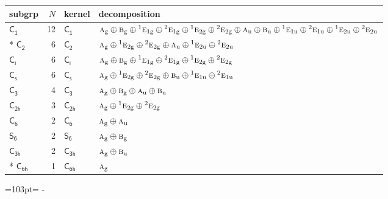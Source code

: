 \documentclass[10pt,a4paper]{article}
\newcommand{\needspace}[1]{\par\penalty-100\begingroup\dimen0=#1\relax\dimen2=\pagegoal
  \advance\dimen2-\pagetotal\ifdim\dimen0>\dimen2\relax\ifdim\dimen2>0pt\vfil\break\fi\fi
  \endgroup}
\numberwithin{equation}{section}
\newcommand{\grp}[1]{\mathsf{#1}}
\newcommand{\irr}[1]{\text{\normalfont\scshape #1}}
\newcommand{\conjpair}[1]{{}^{#1}}
\newcommand{\ptag}[1]{\mathrm{#1}}
\newlength{\fillwidth}\newlength{\cellwidth}\newlength{\colwidth}
\begin{document}
{\begin{longtable}{@{}lrl>{\RaggedRight\arraybackslash}p{\fillwidth}@{}}
subgrp & $N$ & kernel & decomposition\\\midrule\endhead
\bottomrule\endfoot\endlastfoot
\href{C1.pdf}{$\grp{C_{1}}$} & 12 & \href{C1.pdf}{$\grp{C_{1}}$} & $\irr{a}_{\ptag{g}}\oplus \irr{b}_{\ptag{g}}\oplus \conjpair{1}\irr{e}_{1\ptag{g}}\oplus \conjpair{2}\irr{e}_{1\ptag{g}}\oplus \conjpair{1}\irr{e}_{2\ptag{g}}\oplus \conjpair{2}\irr{e}_{2\ptag{g}}\oplus \irr{a}_{\ptag{u}}\oplus \irr{b}_{\ptag{u}}\oplus \conjpair{1}\irr{e}_{1\ptag{u}}\oplus \conjpair{2}\irr{e}_{1\ptag{u}}\oplus \conjpair{1}\irr{e}_{2\ptag{u}}\oplus \conjpair{2}\irr{e}_{2\ptag{u}}$\\*
\href{C2.pdf}{$\grp{C_{2}}$} & 6 & \href{C2.pdf}{$\grp{C_{2}}$} & $\irr{a}_{\ptag{g}}\oplus \conjpair{1}\irr{e}_{2\ptag{g}}\oplus \conjpair{2}\irr{e}_{2\ptag{g}}\oplus \irr{a}_{\ptag{u}}\oplus \conjpair{1}\irr{e}_{2\ptag{u}}\oplus \conjpair{2}\irr{e}_{2\ptag{u}}$\\
\href{S2.pdf}{$\grp{C_{i}}$} & 6 & \href{S2.pdf}{$\grp{C_{i}}$} & $\irr{a}_{\ptag{g}}\oplus \irr{b}_{\ptag{g}}\oplus \conjpair{1}\irr{e}_{1\ptag{g}}\oplus \conjpair{2}\irr{e}_{1\ptag{g}}\oplus \conjpair{1}\irr{e}_{2\ptag{g}}\oplus \conjpair{2}\irr{e}_{2\ptag{g}}$\\
\href{C1v.pdf}{$\grp{C_{s}}$} & 6 & \href{C1v.pdf}{$\grp{C_{s}}$} & $\irr{a}_{\ptag{g}}\oplus \conjpair{1}\irr{e}_{2\ptag{g}}\oplus \conjpair{2}\irr{e}_{2\ptag{g}}\oplus \irr{b}_{\ptag{u}}\oplus \conjpair{1}\irr{e}_{1\ptag{u}}\oplus \conjpair{2}\irr{e}_{1\ptag{u}}$\\
\href{C3.pdf}{$\grp{C_{3}}$} & 4 & \href{C3.pdf}{$\grp{C_{3}}$} & $\irr{a}_{\ptag{g}}\oplus \irr{b}_{\ptag{g}}\oplus \irr{a}_{\ptag{u}}\oplus \irr{b}_{\ptag{u}}$\\
\href{C2h.pdf}{$\grp{C_{2h}}$} & 3 & \href{C2h.pdf}{$\grp{C_{2h}}$} & $\irr{a}_{\ptag{g}}\oplus \conjpair{1}\irr{e}_{2\ptag{g}}\oplus \conjpair{2}\irr{e}_{2\ptag{g}}$\\
\href{C6.pdf}{$\grp{C_{6}}$} & 2 & \href{C6.pdf}{$\grp{C_{6}}$} & $\irr{a}_{\ptag{g}}\oplus \irr{a}_{\ptag{u}}$\\
\href{S6.pdf}{$\grp{S_{6}}$} & 2 & \href{S6.pdf}{$\grp{S_{6}}$} & $\irr{a}_{\ptag{g}}\oplus \irr{b}_{\ptag{g}}$\\
\href{C3h.pdf}{$\grp{C_{3h}}$} & 2 & \href{C3h.pdf}{$\grp{C_{3h}}$} & $\irr{a}_{\ptag{g}}\oplus \irr{b}_{\ptag{u}}$\\*
\href{C6h.pdf}{$\grp{C_{6h}}$} & 1 & \href{C6h.pdf}{$\grp{C_{6h}}$} & $\irr{a}_{\ptag{g}}$\\
\bottomrule\end{longtable}}
\needspace{103pt}
\end{document}
